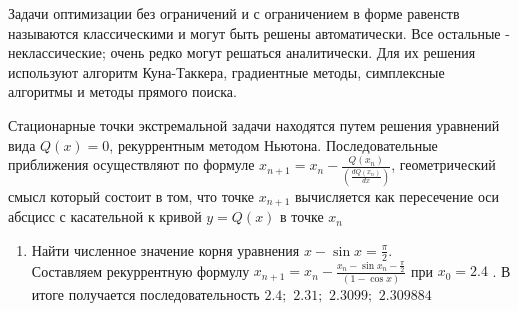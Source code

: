 \documentclass[preprint,russian,a5paper,10pt,twoside]{ncc}
\begin{document}
%
\par Задачи оптимизации без ограничений и с ограничением в форме равенств называются классическими и могут быть решены автоматически. Все остальные - неклассические; очень редко могут решаться аналитически. Для их решения используют алгоритм Куна-Таккера, градиентные методы, симплексные алгоритмы и методы прямого поиска.
\par Стационарные точки экстремальной задачи находятся путем решения уравнений вида $Q\left( x \right)=0$, рекуррентным методом Ньютона. Последовательные приближения осуществляют по формуле ${{x}_{n+1}}={{x}_{n}}-\frac{Q\left( {{x}_{n}} \right)}{\left( \frac{dQ\left( {{x}_{n}} \right)}{dx} \right)}$, геометрический смысл который состоит в том, что точке ${{x}_{n+1}}$ вычисляется как пересечение оси абсцисс с касательной к кривой $y=Q\left( x \right)$ в точке ${{x}_{n}}$ 
\begin{enumerate}[resume]
\item Найти численное значение корня уравнения $x-\sin x=\frac{\pi }{2}$.
\\Составляем рекуррентную формулу ${{x}_{n+1}}={{x}_{n}}-\frac{{{x}_{n}}-\sin {{x}_{n}}-\frac{\pi }{2}}{\left( 1-\cos x \right)}$ при ${{x}_{0}}=2.4$ . В итоге получается последовательность $2.4;$ $2.31;$ $2.3099;$ $2.309884$ 
\end{enumerate}
\end{document}
